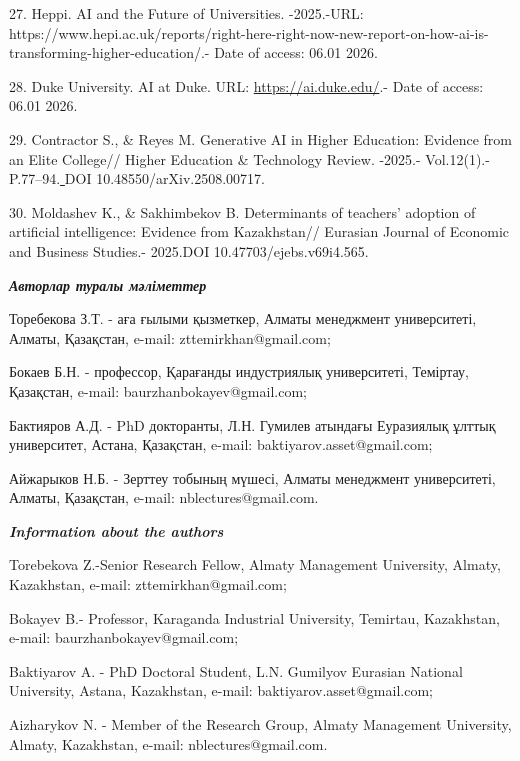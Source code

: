 \begin{refs}
27. Heppi. AI and the Future of Universities. -2025.-URL:
https://www.hepi.ac.uk/reports/right-here-right-now-new-report-on-how-ai-is-transforming-higher-education/.-
Date of access: 06.01 2026.

28. Duke University. AI at Duke. URL: \url{https://ai.duke.edu/}.- Date
of access: 06.01 2026.

29. Contractor S., \& Reyes M. Generative AI in Higher Education:
Evidence from an Elite College// Higher Education \& Technology Review.
-2025.- Vol.12(1).- P.77--94.\ul{\hfill\break
}DOI 10.48550/arXiv.2508.00717.

30. Moldashev K., \& Sakhimbekov B. Determinants of teachers' adoption
of artificial intelligence: Evidence from Kazakhstan// Eurasian Journal
of Economic and Business Studies.- 2025.DOI 10.47703/ejebs.v69i4.565.
\end{refs}

\begin{info}
\hspace{1em}\emph{{\bfseries Авторлар туралы мәліметтер}}

Торебекова З.Т. - аға ғылыми қызметкер, Алматы менеджмент
университеті, Алматы, Қазақстан, e-mail: zttemirkhan@gmail.com;

Бокаев Б.Н. - профессор, Қарағанды индустриялық университеті,
Теміртау, Қазақстан, e-mail: baurzhanbokayev@gmail.com;

Бактияров А.Д. - PhD докторанты, Л.Н. Гумилев атындағы Еуразиялық
ұлттық университет, Астана, Қазақстан, e-mail:
baktiyarov.asset@gmail.com;

Айжарыков Н.Б. - Зерттеу тобының мүшесі, Алматы менеджмент
университеті, Алматы, Қазақстан, e-mail: nblectures@gmail.com.

\hspace{1em}\emph{{\bfseries Information about the authors}}

Torebekova Z.-Senior Research Fellow, Almaty Management University,
Almaty, Kazakhstan, e-mail: zttemirkhan@gmail.com;

Bokayev B.- Professor, Karaganda Industrial University, Temirtau,
Kazakhstan, e-mail: baurzhanbokayev@gmail.com;

Baktiyarov A. - PhD Doctoral Student, L.N. Gumilyov Eurasian National
University, Astana, Kazakhstan, e-mail: baktiyarov.asset@gmail.com;

Aizharykov N. - Member of the Research Group, Almaty Management
University, Almaty, Kazakhstan, e-mail: nblectures@gmail.com.
\end{info}
